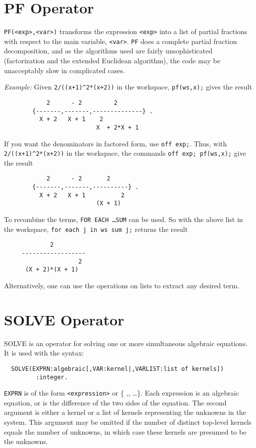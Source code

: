 \section{PF Operator} 

{\tt PF(<exp>,<var>)} transforms the expression {\tt <exp>} into a list of
partial fractions with respect to the main variable, {\tt <var>}.  {\tt PF}
does a complete partial fraction decomposition, and as the algorithms used
are fairly unsophisticated (factorization and the extended Euclidean
algorithm), the code may be unacceptably slow in complicated cases.

{\it Example:}
Given {\tt 2/((x+1)\^{ }2*(x+2))} in the workspace,
{\tt pf(ws,x);} gives the result
\begin{verbatim}
            2      - 2         2
        {-------,-------,--------------} .
          X + 2   X + 1    2
                          X  + 2*X + 1
\end{verbatim}

If you want the denominators in factored form, use {\tt off exp;}.
Thus, with {\tt 2/((x+1)\^{ }2*(x+2))} in the workspace, the commands
{\tt off exp; pf(ws,x);} give the result
\begin{verbatim}
            2      - 2       2
        {-------,-------,----------} .
          X + 2   X + 1          2
                          (X + 1)
\end{verbatim}

To recombine the terms, {\tt FOR EACH \ldots SUM} can be used.  So with
the above list in the workspace, {\tt for each j in ws sum j;} returns the
result
\begin{verbatim}
             2
     ------------------
                     2
      (X + 2)*(X + 1)
\end{verbatim}

Alternatively, one can use the operations on lists to extract any desired
term.

\section{SOLVE Operator}
SOLVE is an operator for solving one or more simultaneous algebraic
equations. It is used with the syntax:
\begin{verbatim}
  SOLVE(EXPRN:algebraic[,VAR:kernel|,VARLIST:list of kernels])
         :integer.
\end{verbatim}
{\tt EXPRN} is of the form {\tt <expression>} or
\{ {\tt <expression1>},{\tt <expression2>}, \dots \}.  Each expression is an
algebraic equation, or is the difference of the two sides of the equation.
The second argument is either a kernel or a list of kernels representing
the unknowns in the system.  This argument may be omitted if the number of
distinct top-level kernels equals the number of unknowns, in which case
these kernels are presumed to be the unknowns.

